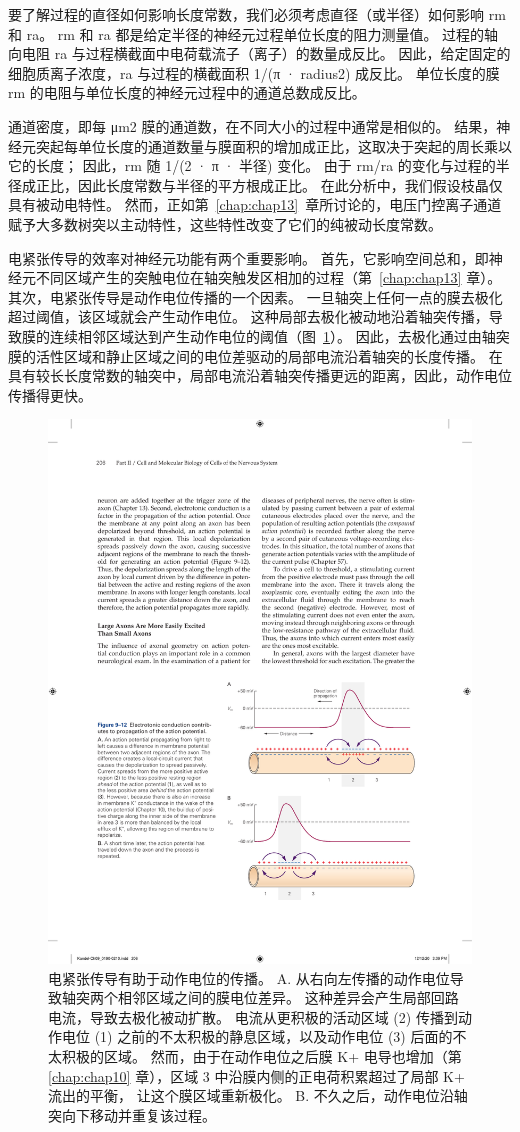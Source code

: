 要了解过程的直径如何影响长度常数，我们必须考虑直径（或半径）如何影响 rm 和 ra。
rm 和 ra 都是给定半径的神经元过程单位长度的阻力测量值。
过程的轴向电阻 ra 与过程横截面中电荷载流子（离子）的数量成反比。 
因此，给定固定的细胞质离子浓度，ra 与过程的横截面积 1/(π · radius2) 成反比。
单位长度的膜 rm 的电阻与单位长度的神经元过程中的通道总数成反比。


通道密度，即每 μm2 膜的通道数，在不同大小的过程中通常是相似的。
结果，神经元突起每单位长度的通道数量与膜面积的增加成正比，这取决于突起的周长乘以它的长度；
因此，rm 随 1/(2 · π · 半径) 变化。
由于 rm/ra 的变化与过程的半径成正比，因此长度常数与半径的平方根成正比。
在此分析中，我们假设枝晶仅具有被动电特性。
然而，正如第~\ref{chap:chap13}~章所讨论的，电压门控离子通道赋予大多数树突以主动特性，这些特性改变了它们的纯被动长度常数。


电紧张传导的效率对神经元功能有两个重要影响。
首先，它影响空间总和，即神经元不同区域产生的突触电位在轴突触发区相加的过程（第~\ref{chap:chap13} 章）。
其次，电紧张传导是动作电位传播的一个因素。
一旦轴突上任何一点的膜去极化超过阈值，该区域就会产生动作电位。
这种局部去极化被动地沿着轴突传播，导致膜的连续相邻区域达到产生动作电位的阈值（图~\ref{fig:9_12}）。 
因此，去极化通过由轴突膜的活性区域和静止区域之间的电位差驱动的局部电流沿着轴突的长度传播。 
在具有较长长度常数的轴突中，局部电流沿着轴突传播更远的距离，因此，动作电位传播得更快。


\begin{figure}[htbp]
	\centering
	\includegraphics[width=0.7\linewidth]{chap09/fig_9_12}
	\caption{电紧张传导有助于动作电位的传播。 A. 从右向左传播的动作电位导致轴突两个相邻区域之间的膜电位差异。 这种差异会产生局部回路电流，导致去极化被动扩散。 电流从更积极的活动区域 (2) 传播到动作电位 (1) 之前的不太积极的静息区域，以及动作电位 (3) 后面的不太积极的区域。 然而，由于在动作电位之后膜 K+ 电导也增加（第 \ref{chap:chap10} 章），区域 3 中沿膜内侧的正电荷积累超过了局部 K+ 流出的平衡， 让这个膜区域重新极化。 B. 不久之后，动作电位沿轴突向下移动并重复该过程。}
	\label{fig:9_12}
\end{figure}



